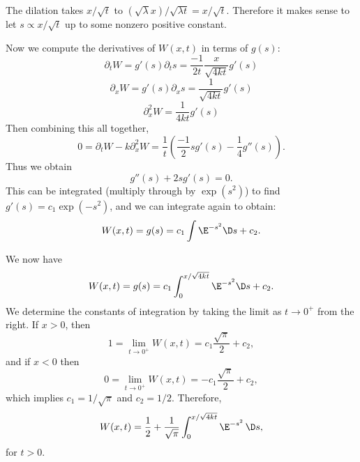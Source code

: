 \begin{node}
\begin{node}[Solution]
\begin{node}[Step 1]
The dilation takes $x/\sqrt{t}$ to $(\sqrt{\lambda}x)/\sqrt{\lambda t}=x/\sqrt{t}$.
Therefore it makes sense to let $s\propto x/\sqrt{t}$ up to some nonzero
positive constant.
\end{node} %

\begin{node}[Step 2]\label{pde:heat-000B}%
Now we compute the derivatives of $W(x,t)$ in terms of $g(s)$:
\begin{equation*}
\partial_{t}W=g'(s)\partial_{t}s=\frac{-1}{2t}\frac{x}{\sqrt{4kt}}g'(s)
\end{equation*}
\begin{equation*}
\partial_{x}W=g'(s)\partial_{x}s=\frac{1}{\sqrt{4kt}}g'(s)
\end{equation*}
\begin{equation*}
\partial_{x}^{2}W=\frac{1}{4kt}g'(s)
\end{equation*}
Then combining this all together,
\begin{equation*}
0 = \partial_{t}W-k\partial_{x}^{2}W=\frac{1}{t}\left(\frac{-1}{2}sg'(s)-\frac{1}{4}g''(s)\right).
\end{equation*}
Thus we obtain
\begin{equation}
g''(s) + 2sg'(s)=0.
\end{equation}
This can be integrated (multiply through by $\exp(s^{2})$) to find
$g'(s)=c_{1}\exp(-s^{2})$, and we can integrate again to obtain:
\begin{equation}
W(x,t)=g(s)=c_{1}\int\E^{-s^{2}}\D s + c_{2}.
\end{equation}
\end{node} %

\begin{node}[Step 3]\label{pde:heat-000C}%
We now have
\begin{equation}
W(x,t)=g(s)=c_{1}\int^{x/\sqrt{4kt}}_{0}\E^{-s^{2}}\D s + c_{2}.
\end{equation}
We determine the constants of integration by taking the limit as
$t\to0^{+}$ from the right. If $x>0$, then
\begin{equation*}
1=\lim_{t\to0^{+}}W(x,t)=c_{1}\frac{\sqrt{\pi}}{2}+c_{2},
\end{equation*}
and if $x<0$ then
\begin{equation*}
0=\lim_{t\to0^{+}}W(x,t)=-c_{1}\frac{\sqrt{\pi}}{2}+c_{2},
\end{equation*}
which implies $c_{1}=1/\sqrt{\pi}$ and $c_{2}=1/2$. Therefore,
\begin{equation}
W(x,t) =
\frac{1}{2}+\frac{1}{\sqrt{\pi}}\int^{x/\sqrt{4kt}}_{0}\E^{-s^{2}}\,\D s,
\end{equation}
for $t>0$.
\end{node} %


\end{node}
\end{node}
